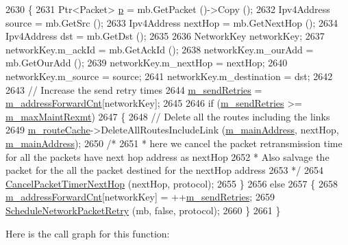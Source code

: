 \begin{DoxyCode}
2630 \{
2631   Ptr<Packet> \hyperlink{lte__link__budget_8m_ac9de518908a968428863f829398a4e62}{p} = mb.GetPacket ()->Copy ();
2632   Ipv4Address source = mb.GetSrc ();
2633   Ipv4Address nextHop = mb.GetNextHop ();
2634   Ipv4Address dst = mb.GetDst ();
2635 
2636   NetworkKey networkKey;
2637   networkKey.m\_ackId = mb.GetAckId ();
2638   networkKey.m\_ourAdd = mb.GetOurAdd ();
2639   networkKey.m\_nextHop = nextHop;
2640   networkKey.m\_source = source;
2641   networkKey.m\_destination = dst;
2642 
2643   \textcolor{comment}{// Increase the send retry times}
2644   \hyperlink{classns3_1_1dsr_1_1DsrRouting_a02a55fe3b490af4dbd62953065d293a3}{m\_sendRetries} = \hyperlink{classns3_1_1dsr_1_1DsrRouting_a5042f7e5df0470025fdb6023fcc24411}{m\_addressForwardCnt}[networkKey];
2645 
2646   \textcolor{keywordflow}{if} (\hyperlink{classns3_1_1dsr_1_1DsrRouting_a02a55fe3b490af4dbd62953065d293a3}{m\_sendRetries} >= \hyperlink{classns3_1_1dsr_1_1DsrRouting_aca44a3d45b57be61ec3e41774f20c1fb}{m\_maxMaintRexmt})
2647     \{
2648       \textcolor{comment}{// Delete all the routes including the links}
2649       \hyperlink{classns3_1_1dsr_1_1DsrRouting_ac409bdb961b9fff0fb63ebd026be99ad}{m\_routeCache}->DeleteAllRoutesIncludeLink (\hyperlink{classns3_1_1dsr_1_1DsrRouting_a73182b5edee2d8460f28855e058fc9a0}{m\_mainAddress}, nextHop, 
      \hyperlink{classns3_1_1dsr_1_1DsrRouting_a73182b5edee2d8460f28855e058fc9a0}{m\_mainAddress});
2650       \textcolor{comment}{/*}
2651 \textcolor{comment}{       * here we cancel the packet retransmission time for all the packets have next hop address as nextHop}
2652 \textcolor{comment}{       * Also salvage the packet for the all the packet destined for the nextHop address}
2653 \textcolor{comment}{       */}
2654       \hyperlink{classns3_1_1dsr_1_1DsrRouting_a215e6fcab10ee0d744a657f0af2695c6}{CancelPacketTimerNextHop} (nextHop, protocol);
2655     \}
2656   \textcolor{keywordflow}{else}
2657     \{
2658       \hyperlink{classns3_1_1dsr_1_1DsrRouting_a5042f7e5df0470025fdb6023fcc24411}{m\_addressForwardCnt}[networkKey] = ++\hyperlink{classns3_1_1dsr_1_1DsrRouting_a02a55fe3b490af4dbd62953065d293a3}{m\_sendRetries};
2659       \hyperlink{classns3_1_1dsr_1_1DsrRouting_a6a18c6baa374d5e6a68f8952d1afdb13}{ScheduleNetworkPacketRetry} (mb, \textcolor{keyword}{false}, protocol);
2660     \}
2661 \}
\end{DoxyCode}


Here is the call graph for this function\+:




